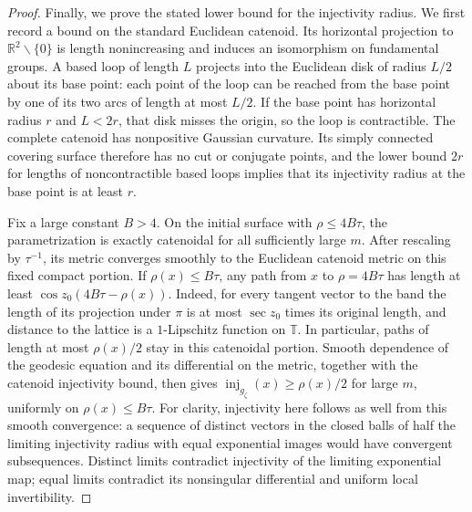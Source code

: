 \documentclass[a4paper,11pt,oneside,reqno]{amsart}
\numberwithin{equation}{section}
\theoremstyle{definition}
\begin{document}
\begin{proof}
    Finally, we prove the stated lower bound for the
    injectivity radius. We first record a bound on the
    standard Euclidean catenoid. Its horizontal projection
    to $\mathbb R^2\smallsetminus\{0\}$ is length
    nonincreasing and induces an isomorphism on fundamental
    groups. A based loop of length $L$ projects into the
    Euclidean disk of radius $L/2$ about its base point:
    each point of the loop can be reached from the base
    point by one of its two arcs of length at most $L/2$.
    If the base point has horizontal radius $r$ and
    $L<2r$, that disk misses the origin, so the loop is
    contractible. The complete catenoid has nonpositive
    Gaussian curvature. Its simply connected covering
    surface therefore has no cut or conjugate points,
    and the lower bound $2r$ for lengths of
    noncontractible based loops implies that its
    injectivity radius at the base point is at least $r$.

    Fix a large constant $B>4$. On the initial surface
    with $\rho\leq4B\tau$, the parametrization is exactly
    catenoidal for all sufficiently large $m$.
    After rescaling by $\tau^{-1}$, its metric converges
    smoothly to the Euclidean catenoid metric on this
    fixed compact portion. If $\rho(x)\leq B\tau$,
    any path from $x$ to $\rho=4B\tau$ has length at
    least $\cos z_0(4B\tau-\rho(x))$. Indeed, for
    every tangent vector to the band the length of its
    projection under $\pi$ is at most $\sec z_0$ times
    its original length, and distance to the lattice is
    a $1$-Lipschitz function on $\mathbb T$.
    In particular, paths of length at most $\rho(x)/2$
    stay in this catenoidal portion. Smooth dependence of
    the geodesic equation and its differential on the
    metric, together with the catenoid injectivity bound,
    then gives
    $\operatorname{inj}_{g_\zeta}(x)\geq\rho(x)/2$
    for large $m$, uniformly on $\rho(x)\leq B\tau$.
    For clarity, injectivity here follows as well from
    this smooth convergence: a sequence of distinct
    vectors in the closed balls of half the limiting
    injectivity radius with equal exponential images
    would have convergent subsequences. Distinct limits
    contradict injectivity of the limiting exponential
    map; equal limits contradict its nonsingular
    differential and uniform local invertibility.


\end{proof}
\end{document}

